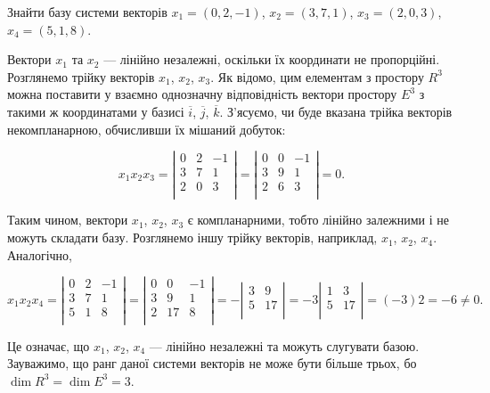 \begin{problem}
	Знайти базу системи векторів $x_1 = (0,2,-1)$, $x_2 = (3,7,1)$, $x_3 = (2,0,3)$, $x_4 = (5,1,8)$.
\end{problem}
\begin{solution}
	Вектори $x_1$ та $x_2$ --- лінійно незалежні, оскільки їх координати не
	пропорційні. Розглянемо трійку векторів $x_1$, $x_2$, $x_3$. Як відомо, цим елементам з
	простору $R^3$ можна поставити у взаємно однозначну відповідність вектори
	простору $E^3$ з такими ж координатами у базисі $\overline{i}$, $\overline{j}$, $\overline{k}$. З’ясуємо, чи буде вказана
	трійка векторів некомпланарною, обчисливши їх мішаний добуток:

	$$x_1 x_2 x_3 = \left|\begin{matrix}
		0 & 2 & -1 \\
		3 & 7 & 1 \\
		2 & 0 & 3 \\
	\end{matrix}\right| = \left|\begin{matrix}
		0 & 0 & -1 \\
		3 & 9 & 1 \\
		2 & 6 & 3 \\
	\end{matrix}\right| = 0.$$

	Таким чином, вектори $x_1$, $x_2$, $x_3$ є компланарними, тобто лінійно залежними і
	не можуть складати базу. Розглянемо іншу трійку векторів, наприклад, $x_1$, $x_2$, $x_4$.
	Аналогічно,
	
	$$x_1 x_2 x_4 = \left|\begin{matrix}
		0 & 2 & -1 \\
		3 & 7 & 1 \\
		5 & 1 & 8 \\
	\end{matrix}\right| = \left|\begin{matrix}
		0 & 0 & -1 \\
		3 & 9 & 1 \\
		2 & 17 & 8 \\
	\end{matrix}\right| = - \left|\begin{matrix}
		3 & 9 \\
		5 & 17 \\
	\end{matrix}\right| = -3 \left|\begin{matrix}
		1 & 3 \\
		5 & 17 \\
	\end{matrix}\right| = (-3) 2 = -6 \neq 0.$$

	Це означає, що $x_1$, $x_2$, $x_4$ --- лінійно незалежні та можуть слугувати базою.
	Зауважимо, що ранг даної системи векторів не може бути більше трьох, бо
	$\dim R^3 = \dim E^3 = 3$.
\end{solution}

